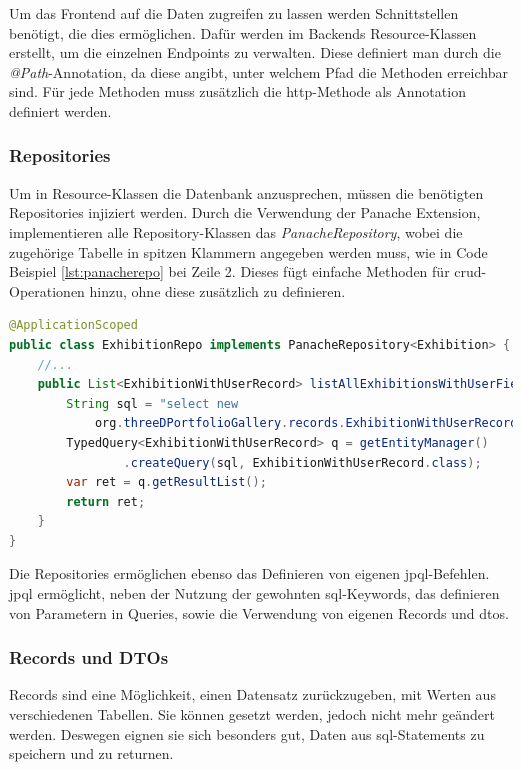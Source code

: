 Um das Frontend auf die Daten zugreifen zu lassen werden Schnittstellen benötigt, die dies ermöglichen. 
Dafür werden im Backends Resource-Klassen erstellt, um die einzelnen Endpoints zu verwalten. 
Diese definiert man durch die \emph{@Path}-Annotation, da diese angibt, unter welchem Pfad die Methoden erreichbar sind. 
Für jede Methoden muss zusätzlich die \gls{http}-Methode als Annotation definiert werden. 

\subsubsection{Repositories} 
Um in Resource-Klassen die Datenbank anzusprechen, müssen die benötigten Repositories injiziert werden. 
Durch die Verwendung der Panache Extension, implementieren alle Repository-Klassen das \emph{PanacheRepository}, wobei die zugehörige Tabelle in spitzen Klammern angegeben werden muss, wie in Code Beispiel \ref{lst:panacherepo} bei Zeile 2.
Dieses fügt einfache Methoden für \gls{crud}-Operationen hinzu, ohne diese zusätzlich zu definieren. 

\begin{lstlisting}[label=lst:panacherepo, language=Java, caption=Teil aus dem Exhibition Repository]
@ApplicationScoped
public class ExhibitionRepo implements PanacheRepository<Exhibition> {
    //...
    public List<ExhibitionWithUserRecord> listAllExhibitionsWithUserField() {
        String sql = "select new 
            org.threeDPortfolioGallery.records.ExhibitionWithUserRecord(e, u.user_name, u.icon_url) from Exhibition e join e.user u left join e.categories c";
        TypedQuery<ExhibitionWithUserRecord> q = getEntityManager()
                .createQuery(sql, ExhibitionWithUserRecord.class);
        var ret = q.getResultList();
        return ret;
    }
}
\end{lstlisting}

Die Repositories ermöglichen ebenso das Definieren von eigenen \gls{jpql}-Befehlen. 
\gls{jpql} ermöglicht, neben der Nutzung der gewohnten \gls{sql}-Keywords, das definieren von Parametern in Queries, sowie die Verwendung von eigenen Records und \gls{dto}s.

\subsubsection{Records und DTOs}
Records sind eine Möglichkeit, einen Datensatz zurückzugeben, mit Werten aus verschiedenen Tabellen. 
Sie können gesetzt werden, jedoch nicht mehr geändert werden. 
Deswegen eignen sie sich besonders gut, Daten aus \gls{sql}-Statements zu speichern und zu returnen.


